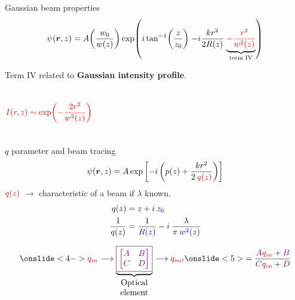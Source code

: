 \documentclass[12pt, dvipsnames]{beamer}
\numberwithin{equation}{section}
\begin{document}
\begin{frame}[t]{Gaussian beam properties}\vspace{-16pt} %
	$$\psi(\boldsymbol{r},z)=A
	{\left(\frac{w_0}{w(z)}\right)}
	\exp(
	{i\tan[-1](\frac{z}{z_0})}\;
	{-i\frac{kr^2}{2R(z)}}\;
	{\underbrace{\color{red}-\frac{r^2}{w^2(z)}}_{\text{term IV}}}
	)$$
	
	{Term IV related to \textbf{Gaussian intensity profile}.\pause
		\begin{columns}
				$$\color{red}I(r,z)\sim \exp(-\frac{2r^2}{w^2(z)})$$\pause
			
	\end{columns}}
\end{frame}







\begin{frame}[t]{$q$ parameter and beam tracing}
	$$\psi(\boldsymbol{r},z)= A \exp\left[-i\left(p(z) + \frac{kr^2}{2\:{\color{red}q(z)}}\right)\right]$$\pause
	$\color{red}q(z)$ $\longrightarrow$ characteristic of a beam if $\lambda$ known.\pause
	\begin{align*}
		q(z) &= z + i\:\color{blue}z_0\\
		\frac{1}{q(z)} &= \frac{1}{\color{blue}R(z)} - i\: \frac{\lambda}{\pi\: \color{blue}w^2(z)}
	\end{align*}\pause

\begin{align*}\onslide<4->{{\color{red}q_{in}}\longrightarrow
	\underbrace{\boxed{\color{violet}{\begin{bmatrix}
		A&B\\
		C&D
	\end{bmatrix}}}}_{\begin{matrix}\text{Optical}\\ \text{element} \end{matrix}}
	\longrightarrow {\color{red}q_{out}}} \onslide<5>{= \frac{{\color{violet}A} {\color{red}q_{in}}+{\color{violet}B}}{{\color{violet}C} {\color{red}q_{in}}+ {\color{violet}D}}}
\end{align*}
\end{frame}
\end{document}
